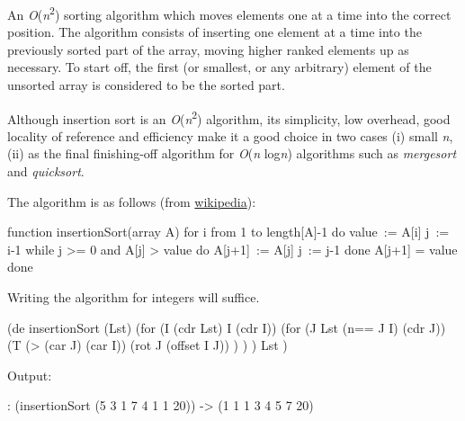An \emph{O}(\emph{n}\textsuperscript{2}) sorting algorithm
which moves elements one at a time into the correct position. The
algorithm consists of inserting one element at a time into the
previously sorted part of the array, moving higher ranked elements up as
necessary. To start off, the first (or smallest, or any arbitrary)
element of the unsorted array is considered to be the sorted part.

Although insertion sort is an \emph{O}(\emph{n}\textsuperscript{2})
algorithm, its simplicity, low overhead, good locality of reference
and efficiency make it a good choice in two cases (i) small \emph{n},
(ii) as the final finishing-off algorithm for \emph{O}(\emph{n}
log\emph{n}) algorithms such as \emph{mergesort} and \emph{quicksort}.

The algorithm is as follows (from
\href{http://en.wikipedia.org/wiki/Insertion\_sort\#Algorithm}{wikipedia}):

\begin{wideverbatim}
function insertionSort(array A)
    for i from 1 to length[A]-1 do
        value := A[i] 
        j := i-1
        while j >= 0 and A[j] > value do
            A[j+1] := A[j]
            j := j-1
        done
        A[j+1] = value
    done
\end{wideverbatim}

Writing the algorithm for integers will suffice.

\begin{wideverbatim}

(de insertionSort (Lst)
   (for (I (cdr Lst)  I  (cdr I))
      (for (J Lst  (n== J I)  (cdr J))
         (T (> (car J) (car I))
            (rot J (offset I J)) ) ) )
   Lst )

Output:

: (insertionSort (5 3 1 7 4 1 1 20))
-> (1 1 1 3 4 5 7 20)

\end{wideverbatim}




